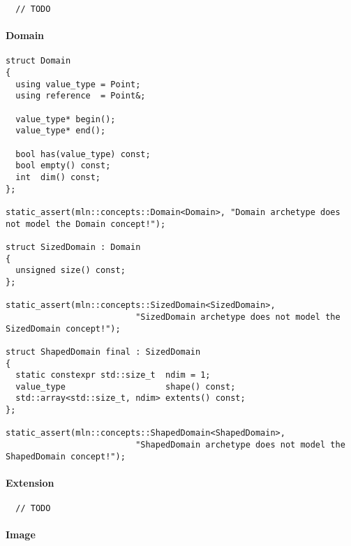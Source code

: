 \begin{verbatim}
  // TODO
\end{verbatim}


\paragraph{Domain}

\begin{verbatim}
struct Domain
{
  using value_type = Point;
  using reference  = Point&;

  value_type* begin();
  value_type* end();

  bool has(value_type) const;
  bool empty() const;
  int  dim() const;
};

static_assert(mln::concepts::Domain<Domain>, "Domain archetype does not model the Domain concept!");

struct SizedDomain : Domain
{
  unsigned size() const;
};

static_assert(mln::concepts::SizedDomain<SizedDomain>,
                          "SizedDomain archetype does not model the SizedDomain concept!");

struct ShapedDomain final : SizedDomain
{
  static constexpr std::size_t  ndim = 1;
  value_type                    shape() const;
  std::array<std::size_t, ndim> extents() const;
};

static_assert(mln::concepts::ShapedDomain<ShapedDomain>,
                          "ShapedDomain archetype does not model the ShapedDomain concept!");
\end{verbatim}


\paragraph{Extension}

\begin{verbatim}
  // TODO
\end{verbatim}


\paragraph{Image}

